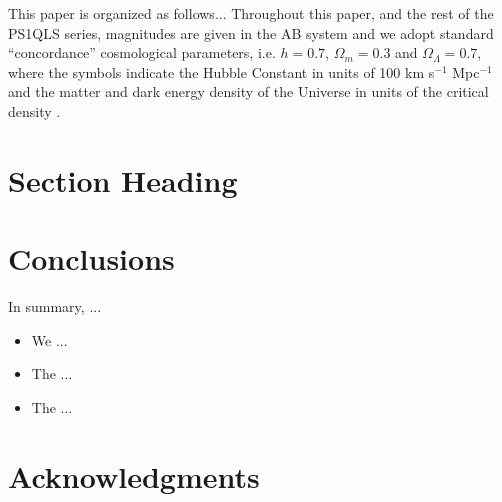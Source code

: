 \documentclass[useAMS,usenatbib]{mn2e}
\begin{document}







This paper is organized as follows... Throughout this paper, and the
rest of the PS1QLS series, magnitudes are given in the AB system
\citep{Oke74} and we adopt standard ``concordance'' cosmological
parameters, i.e. $h=0.7$, $\Omega_m=0.3$ and $\Omega_\Lambda=0.7$, where
the symbols indicate the Hubble Constant in units of 100 km s$^{-1}$
Mpc$^{-1}$ and the matter and dark energy density of the Universe in
units of the critical density \citep[e.g.\ ][]{Kom++09}.



\section{Section Heading}
\label{sec:xxx}




\section{Conclusions}
\label{sec:conclusions}

In summary, ...

\begin{itemize}

\item We ...

\item The ...

\item The ...

\end{itemize}




\section*{Acknowledgments}
 
\end{document}
